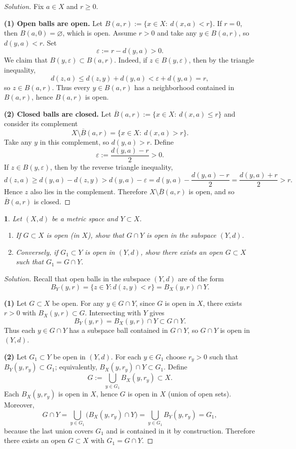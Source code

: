 \documentclass[12pt, a4paper]{report}
\theoremstyle{spaced}
\newtheorem{exercise}{}
\newcommand{\setexercise}[1]{\setcounter{exercise}{#1-1}}
\begin{document}
\begin{proof}[Solution]
	Fix $a\in X$ and $r\ge 0$.

	\medskip
	\noindent\textbf{(1) Open balls are open.}
	Let $B(a,r):=\{x\in X:\ d(x,a)<r\}$.
	If $r=0$, then $B(a,0)=\varnothing$, which is open.
	Assume $r>0$ and take any $y\in B(a,r)$, so $d(y,a)<r$.
	Set
	\[
		\varepsilon:=r-d(y,a)>0.
	\]
	We claim that $B(y,\varepsilon)\subset B(a,r)$.
	Indeed, if $z\in B(y,\varepsilon)$, then by the triangle inequality,
	\[
		d(z,a)\le d(z,y)+d(y,a)<\varepsilon+d(y,a)=r,
	\]
	so $z\in B(a,r)$. Thus every $y\in B(a,r)$ has a neighborhood contained in $B(a,r)$,
	hence $B(a,r)$ is open.

	\medskip
	\noindent\textbf{(2) Closed balls are closed.}
	Let $\overline{B}(a,r):=\{x\in X:\ d(x,a)\le r\}$ and consider its complement
	\[
		X\setminus \overline{B}(a,r)=\{x\in X:\ d(x,a)>r\}.
	\]
	Take any $y$ in this complement, so $d(y,a)>r$.  Define
	\[
		\varepsilon:=\frac{d(y,a)-r}{2}>0.
	\]
	If $z\in B(y,\varepsilon)$, then by the reverse triangle inequality,
	\[
		d(z,a)\ge d(y,a)-d(z,y)> d(y,a)-\varepsilon
		= d(y,a)-\frac{d(y,a)-r}{2}=\frac{d(y,a)+r}{2}>r.
	\]
	Hence $z$ also lies in the complement. Therefore $X\setminus \overline{B}(a,r)$ is open,
	and so $\overline{B}(a,r)$ is closed.
\end{proof}
\setexercise{8}

\begin{exercise}
	Let $(X,d)$ be a metric space and $Y\subset X$.
	\begin{enumerate}
		\item If $G\subset X$ is open (in $X$), show that $G\cap Y$ is open in the subspace $(Y,d)$.
		\item Conversely, if $G_1\subset Y$ is open in $(Y,d)$, show there exists an open $G\subset X$ such that
		      $G_1=G\cap Y$.
	\end{enumerate}
\end{exercise}

\begin{proof}[Solution]
	Recall that open balls in the subspace $(Y,d)$ are of the form
	\[
		B_Y(y,r)=\{z\in Y: d(z,y)<r\}=B_X(y,r)\cap Y.
	\]

	\textbf{(1)} Let $G\subset X$ be open. For any $y\in G\cap Y$, since $G$ is open in $X$, there exists $r>0$
	with $B_X(y,r)\subset G$. Intersecting with $Y$ gives
	\[
		B_Y(y,r)=B_X(y,r)\cap Y\subset G\cap Y.
	\]
	Thus each $y\in G\cap Y$ has a subspace ball contained in $G\cap Y$, so $G\cap Y$ is open in $(Y,d)$.

	\medskip
	\textbf{(2)} Let $G_1\subset Y$ be open in $(Y,d)$. For each $y\in G_1$ choose $r_y>0$ such that
	$B_Y(y,r_y)\subset G_1$; equivalently, $B_X(y,r_y)\cap Y\subset G_1$.
	Define
	\[
		G:=\bigcup_{y\in G_1} B_X(y,r_y)\subset X.
	\]
	Each $B_X(y,r_y)$ is open in $X$, hence $G$ is open in $X$ (union of open sets). Moreover,
	\[
		G\cap Y=\bigcup_{y\in G_1}\bigl(B_X(y,r_y)\cap Y\bigr)
		=\bigcup_{y\in G_1} B_Y(y,r_y)=G_1,
	\]
	because the last union covers $G_1$ and is contained in it by construction. Therefore there exists
	an open $G\subset X$ with $G_1=G\cap Y$.
\end{proof}
\end{document}
